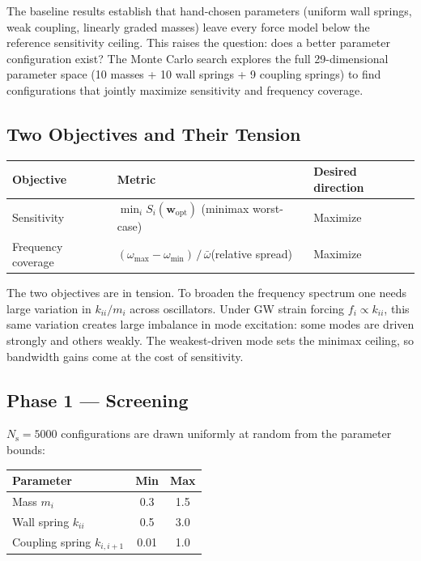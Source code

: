 \documentclass[11pt, letterpaper]{article}
\begin{document}
The baseline results establish that hand-chosen parameters (uniform wall
springs, weak coupling, linearly graded masses) leave every force model below
the reference sensitivity ceiling.  This raises the question: does a better
parameter configuration exist?  The Monte Carlo search explores the full
29-dimensional parameter space (10 masses + 10 wall springs + 9 coupling
springs) to find configurations that jointly maximize sensitivity and
frequency coverage.

\subsection{Two Objectives and Their Tension}

\begin{center}
\begin{tabular}{lll}
  \toprule
  Objective & Metric & Desired direction \\
  \midrule
  Sensitivity
    & $\min_i S_i(\mathbf{w}_\mathrm{opt})$ \quad (minimax worst-case)
    & Maximize \\
  Frequency coverage
    & $(\omega_{\max} - \omega_{\min})\,/\,\bar{\omega}$\quad (relative spread)
    & Maximize \\
  \bottomrule
\end{tabular}
\end{center}

The two objectives are in tension.  To broaden the frequency spectrum one
needs large variation in $k_{ii}/m_i$ across oscillators.  Under GW strain
forcing $f_i \propto k_{ii}$, this same variation creates large imbalance in
mode excitation: some modes are driven strongly and others weakly.  The
weakest-driven mode sets the minimax ceiling, so bandwidth gains come at the
cost of sensitivity.

\subsection{Phase 1 --- Screening}

$N_\mathrm{s} = 5000$ configurations are drawn uniformly at random from
the parameter bounds:

\begin{center}
\begin{tabular}{lcc}
  \toprule
  Parameter & Min & Max \\
  \midrule
  Mass $m_i$          & 0.3 & 1.5 \\
  Wall spring $k_{ii}$ & 0.5 & 3.0 \\
  Coupling spring $k_{i,i+1}$ & 0.01 & 1.0 \\
  \bottomrule
\end{tabular}
\end{center}
\end{document}
